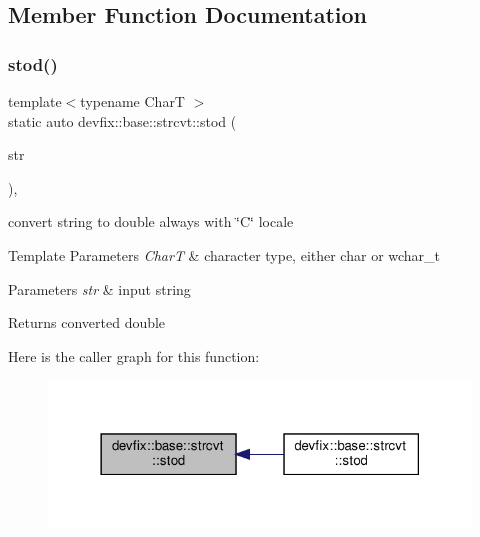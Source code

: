 \subsection{Member Function Documentation}
\mbox{\label{structdevfix_1_1base_1_1strcvt_a63350be05c30f4cffee9d8dc8eed54d5}} 
\subsubsection{\texorpdfstring{stod()}{stod()}\hspace{0.1cm}{\footnotesize\ttfamily [1/2]}}
{\footnotesize\ttfamily template$<$typename CharT $>$ \\
static auto devfix\+::base\+::strcvt\+::stod (\begin{DoxyParamCaption}\item[{const std\+::basic\+\_\+string$<$ CharT $>$ \&}]{str }\end{DoxyParamCaption})\hspace{0.3cm}{\ttfamily [inline]}, {\ttfamily [static]}}



convert string to double always with \char`\"{}\+C\char`\"{} locale 


\begin{DoxyTemplParams}{Template Parameters}
{\em CharT} & character type, either \textquotesingle{}char\textquotesingle{} or \textquotesingle{}wchar\+\_\+t\textquotesingle{} \\
\hline
\end{DoxyTemplParams}

\begin{DoxyParams}{Parameters}
{\em str} & input string \\
\hline
\end{DoxyParams}
\begin{DoxyReturn}{Returns}
converted double 
\end{DoxyReturn}
Here is the caller graph for this function\+:\nopagebreak
\begin{figure}[H]
\begin{center}
\leavevmode
\includegraphics[width=318pt]{structdevfix_1_1base_1_1strcvt_a63350be05c30f4cffee9d8dc8eed54d5_icgraph}
\end{center}
\end{figure}
\mbox{\label{structdevfix_1_1base_1_1strcvt_aec0faa61c87e1206ef3a50d5bb197fe7}} 
